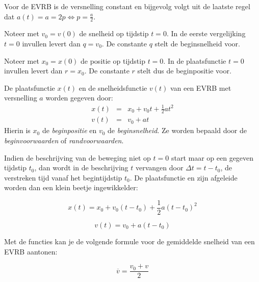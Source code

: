 \documentclass{ximera}
\begin{document}
Voor de EVRB is de versnelling constant en bijgevolg volgt uit de laatste regel dat $a(t)=a=2p\Leftrightarrow p=\frac{a}{2}$. 

Noteer met $v_0=v(0)$ de snelheid op tijdstip $t=0$. In de eerste vergelijking $t=0$ invullen levert dan $q=v_0$. De constante $q$ stelt de beginsnelheid voor. 

Noteer met $x_0=x(0)$ de positie op tijdstip $t=0$. In de plaatsfunctie $t=0$ invullen levert dan $r=x_0$. De constante $r$ stelt dus de beginpositie voor.


\begin{theorem}
De plaatsfunctie $x(t)$ en de snelheidsfunctie $v(t)$ van een EVRB met versnelling $a$ worden gegeven door:
\[
\begin{array}{rcl}
x(t)&=&x_0+v_0t+\frac{1}{2}at^2\\
v(t)&=&v_0+at
\end{array}
\]
Hierin is $x_0$ de \textit{beginpositie} en $v_0$ de \textit{beginsnelheid}. Ze worden bepaald door de \textit{beginvoorwaarden} of \textit{randvoorwaarden}.
\end{theorem}	

Indien de beschrijving van de beweging niet op $t=0$ start maar op een gegeven tijdstip $t_0$, dan wordt in de beschrijving $t$ vervangen door $\Delta t= t-t_0$, de verstreken tijd vanaf het begintijdstip $t_0$. De plaatsfunctie en zijn afgeleide worden dan een klein beetje ingewikkelder:

\[
x(t) = x_0+v_0(t-t_0)+\frac{1}{2}a(t-t_0)^2
\]

\[
v(t) = v_0+a(t-t_0)
\]

Met de functies kan je de volgende formule voor de gemiddelde snelheid van een EVRB aantonen:


\[
\overline{v}=\frac{v_0+v}{2}
\]
	
\end{document}
